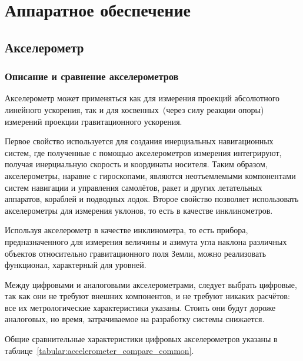 \documentclass[document.tex]{subfiles}
\begin{document}
\section{Аппаратное обеспечение}
\subsection{Акселерометр}
\subsubsection{Описание и сравнение акселерометров}
Акселерометр может применяться как для измерения проекций абсолютного линейного
ускорения, так и для косвенных~(через силу реакции опоры) измере\-ний проекции
гравитаци\-онного ускорения.

Первое свойство используется для создания инерциальных навигационных систем, где
полученные с помощью акселерометров измерения интегрируют, получая
инерци\-альную ско\-рость и координаты носителя. Таким образом, аксе\-лерометры, наравне с
гироско\-пами, являются неотъемлемыми компонентами систем навигации и управления
самолётов, ракет и других летательных аппа\-ратов, кораблей и подводных лодок.
Второе свойство позволяет использовать акселерометры для измерения уклонов, то
есть в качестве инклино\-метров.\cite{accelerometer_info}

Используя акселерометр в качестве инклинометра, то есть прибора,
предна\-значенного для измерения величины и азимута угла наклона различных
объек\-тов относительно гравита\-ционного поля Земли, можно реализовать функционал,
характерный для уровней.

Между цифровыми и аналоговыми акселерометрами, следует выбрать циф\-ровые, так
как они не требуют внешних компонентов, и не требуют никаких расчётов: все их
метро\-логические характеристики указаны. Стоить они будут дороже аналоговых, но
время, затра\-чиваемое на разработку системы
снижается.\cite{accelerometer_compare}

Общие сравнительные характеристики цифровых акселерометров указаны в таблице~\ref{tabular:accelerometer_compare_common}.
\end{document}
